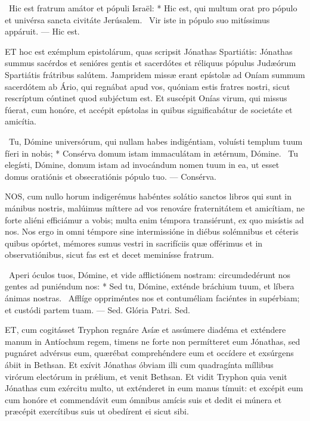 \R\ Hic est fratrum amátor et pópuli Israël: * Hic est, qui multum orat pro pópulo et univérsa sancta civitáte Jerúsalem. \V\ Vir iste in pópulo suo mitíssimus appáruit. — Hic est.


\lettrine[lines=2]{E}{T} hoc est exémplum epistolárum, quas scripsit Jónathas Spartiátis: Jónathas summus sacérdos et senióres gentis et sacerdótes et réliquus pópulus Judæórum Spartiátis frátribus salútem. Jampridem missæ erant epístolæ ad Oníam summum sacerdótem ab Ário, qui regnábat apud vos, quóniam estis fratres nostri, sicut rescríptum cóntinet quod subjéctum est. Et suscépit Onías virum, qui missus fúerat, cum honóre, et accépit epístolas in quibus significabátur de societáte et amicítia.

\R\ Tu, Dómine universórum, qui nullam habes indigéntiam, voluísti templum tuum fíeri in nobis; * Consérva domum istam immaculátam in ætérnum, Dómine. \V\ Tu elegísti, Dómine, domum istam ad invocándum nomen tuum in ea, ut esset domus oratiónis et obsecratiónis pópulo tuo. — Consérva.



\lettrine[lines=2]{N}{OS}, cum nullo horum indigerémus habéntes solátio sanctos libros qui sunt in mánibus nostris, malúimus míttere ad vos renováre fraternitátem et amicítiam, ne forte aliéni efficiámur a vobis; multa enim témpora transiérunt, ex quo misístis ad nos. Nos ergo in omni témpore sine intermissióne in diébus solémnibus et céteris quibus opórtet, mémores sumus vestri in sacrifíciis quæ offérimus et in observatiónibus, sicut fas est et decet meminísse fratrum.

\R\ Aperi óculos tuos, Dómine, et vide afflictiónem nostram: circumdedérunt nos gentes ad puniéndum nos: * Sed tu, Dómine, exténde bráchium tuum, et líbera ánimas nostras. \V\ Afflíge oppriméntes nos et contuméliam faciéntes in supérbiam; et custódi partem tuam. — Sed. Glória Patri. Sed.




\lettrine[lines=2]{E}{T}, cum cogitásset Tryphon regnáre Asíæ et assúmere diadéma et exténdere manum in Antíochum regem, timens ne forte non permítteret eum Jónathas, sed pugnáret advérsus eum, quærébat comprehéndere eum et occídere et exsúrgens ábiit in Bethsan. Et exívit Jónathas óbviam illi cum quadragínta míllibus virórum electórum in prǽlium, et venit Bethsan. Et vidit Tryphon quia venit Jónathas cum exércitu multo, ut exténderet in eum manus tímuit: et excépit eum cum honóre et commendávit eum ómnibus amícis suis et dedit ei múnera et præcépit exercítibus suis ut obedírent ei sicut sibi.

